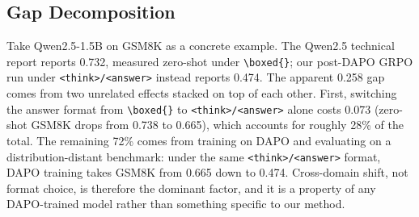 \documentclass[11pt]{article}
\theoremstyle{definition}
\theoremstyle{remark}
\begin{document}
\subsection{Gap Decomposition}

Take Qwen2.5-1.5B on GSM8K as a concrete example. The Qwen2.5 technical report reports 0.732, measured zero-shot under \texttt{\textbackslash boxed\{\}}; our post-DAPO GRPO run under \texttt{<think>/<answer>} instead reports 0.474. The apparent 0.258 gap comes from two unrelated effects stacked on top of each other. First, switching the answer format from \texttt{\textbackslash boxed\{\}} to \texttt{<think>/<answer>} alone costs 0.073 (zero-shot GSM8K drops from 0.738 to 0.665), which accounts for roughly 28\% of the total. The remaining 72\% comes from training on DAPO and evaluating on a distribution-distant benchmark: under the same \texttt{<think>/<answer>} format, DAPO training takes GSM8K from 0.665 down to 0.474. Cross-domain shift, not format choice, is therefore the dominant factor, and it is a property of any DAPO-trained model rather than something specific to our method.


\end{document}
